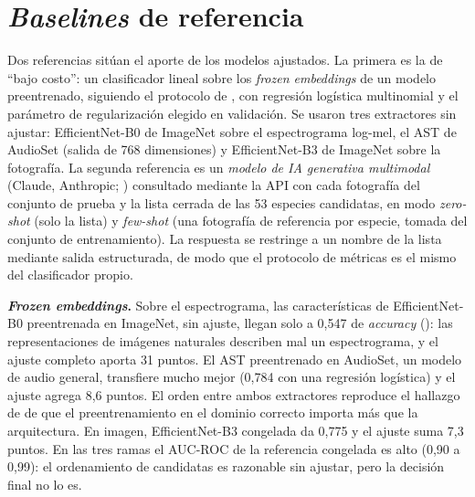 \section{\textit{Baselines} de referencia}\label{sec:res-baselines}

Dos referencias sitúan el aporte de los modelos ajustados. La primera es la
de ``bajo costo'': un clasificador lineal sobre los \textit{frozen embeddings} de un modelo preentrenado, siguiendo el protocolo de
\citet{ghani2023embeddings}, con regresión logística multinomial y el
parámetro de regularización elegido en validación. Se usaron tres
extractores sin ajustar: EfficientNet-B0 de ImageNet sobre el espectrograma
log-mel, el AST de AudioSet (salida de 768 dimensiones) y EfficientNet-B3 de
ImageNet sobre la fotografía. La segunda referencia es un \emph{modelo de IA
generativa multimodal} (Claude, Anthropic;
\citealp{anthropic2026claude}) consultado mediante la API con cada
fotografía del conjunto de prueba y la lista cerrada de las 53 especies
candidatas, en modo \textit{zero-shot} (solo la lista) y \textit{few-shot}
(una fotografía de referencia por especie, tomada del conjunto de
entrenamiento). La respuesta se restringe a un nombre de la lista mediante
salida estructurada, de modo que el protocolo de métricas es el mismo del
clasificador propio.



\textbf{\textit{Frozen embeddings}.} Sobre el espectrograma, las características
de EfficientNet-B0 preentrenada en ImageNet, sin ajuste, llegan solo a
0,547 de \textit{accuracy} (): las representaciones
de imágenes naturales describen mal un espectrograma, y el ajuste completo
aporta 31 puntos. El AST preentrenado en AudioSet, un modelo de audio
general, transfiere mucho mejor (0,784 con una regresión logística) y el
ajuste agrega 8,6 puntos. El orden entre ambos extractores reproduce el
hallazgo de \citet{ghani2023embeddings} de que el preentrenamiento en el
dominio correcto importa más que la arquitectura. En imagen,
EfficientNet-B3 congelada da 0,775 y el ajuste suma 7,3 puntos. En las tres
ramas el AUC-ROC de la referencia congelada es alto (0,90 a 0,99): el
ordenamiento de candidatas es razonable sin ajustar, pero la decisión final
no lo es.


